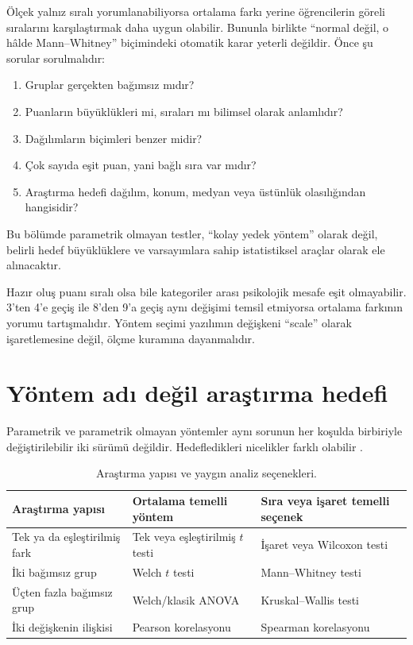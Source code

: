 Ölçek yalnız sıralı yorumlanabiliyorsa ortalama farkı yerine öğrencilerin
göreli sıralarını karşılaştırmak daha uygun olabilir. Bununla birlikte
``normal değil, o hâlde Mann--Whitney'' biçimindeki otomatik karar yeterli
değildir. Önce şu sorular sorulmalıdır:

\begin{enumerate}
  \item Gruplar gerçekten bağımsız mıdır?
  \item Puanların büyüklükleri mi, sıraları mı bilimsel olarak anlamlıdır?
  \item Dağılımların biçimleri benzer midir?
  \item Çok sayıda eşit puan, yani bağlı sıra var mıdır?
  \item Araştırma hedefi dağılım, konum, medyan veya üstünlük olasılığından hangisidir?
\end{enumerate}


Bu bölümde parametrik olmayan testler, ``kolay yedek yöntem'' olarak değil,
belirli hedef büyüklüklere ve varsayımlara sahip istatistiksel araçlar olarak
ele alınacaktır.

\begin{researchbox}
Hazır oluş puanı sıralı olsa bile kategoriler arası psikolojik mesafe eşit
olmayabilir. 3'ten 4'e geçiş ile 8'den 9'a geçiş aynı değişimi temsil etmiyorsa
ortalama farkının yorumu tartışmalıdır. Yöntem seçimi yazılımın değişkeni
``scale'' olarak işaretlemesine değil, ölçme kuramına dayanmalıdır.
\end{researchbox}

\section{Yöntem adı değil araştırma hedefi}

Parametrik ve parametrik olmayan yöntemler aynı sorunun her koşulda birbiriyle
değiştirilebilir iki sürümü değildir. Hedefledikleri nicelikler farklı olabilir
\cite{hollander2013,lehmann2006,wasserman2006}.

\begin{table}[htbp]
\centering
\caption{Araştırma yapısı ve yaygın analiz seçenekleri.}
\begin{tabular}{@{}p{}p{}p{}@{}}
\toprule
Araştırma yapısı & Ortalama temelli yöntem & Sıra veya işaret temelli seçenek \\
\midrule
Tek ya da eşleştirilmiş fark & Tek veya eşleştirilmiş $t$ testi & İşaret veya Wilcoxon testi \\
İki bağımsız grup & Welch $t$ testi & Mann--Whitney testi \\
Üçten fazla bağımsız grup & Welch/klasik ANOVA & Kruskal--Wallis testi \\
İki değişkenin ilişkisi & Pearson korelasyonu & Spearman korelasyonu \\
\bottomrule
\end{tabular}
\end{table}

